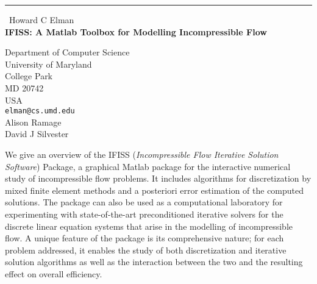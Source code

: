 \documentclass{report}
\begin{document}
\begin{center}
\rule{6in}{1pt} \
{\large Howard C Elman \\
{\bf IFISS: A Matlab Toolbox for Modelling Incompressible Flow}}

Department of Computer Science \\ University of Maryland \\ College Park \\ MD 20742 \\ USA
\\
{\tt elman@cs.umd.edu}\\
Alison Ramage\\
David J Silvester\end{center}

We give an overview of the IFISS ({\em Incompressible Flow Iterative
Solution Software}) Package, a graphical Matlab package for the
interactive numerical study of incompressible flow problems. It includes
algorithms for discretization by mixed finite element methods and a
posteriori error estimation of the computed solutions. The package can
also be used as a computational laboratory for experimenting with
state-of-the-art preconditioned iterative solvers for the discrete linear
equation systems that
arise in the modelling of incompressible flow. A unique feature of the
package is its comprehensive nature; for each problem addressed, it
enables the study of both discretization and iterative solution
algorithms as well as the interaction between the two and the resulting
effect on overall efficiency.
\end{document}
